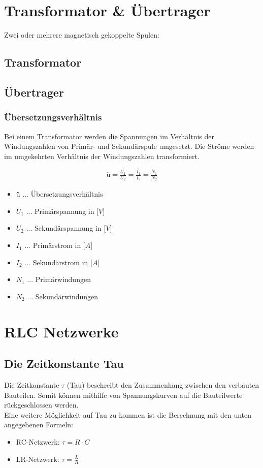 \newpage

\section{Transformator \& Übertrager}
Zwei oder mehrere magnetisch gekoppelte Spulen:

\subsection{Transformator}

\subsection{Übertrager}

\subsubsection*{Übersetzungsverhältnis}

Bei einem Transformator werden die Spannungen im Verhältnis der Windungszahlen von Primär- und Sekundärspule umgesetzt. Die Ströme werden im umgekehrten Verhältnis der Windungszahlen transformiert.

\begin{align}
    \text{ü} = \frac{U_1}{U_2} = \frac{I_1}{I_2} = \frac{N_1}{N_2}
\end{align}
\begin{itemize}
    \item ü ... Übersetzungsverhältnis
    \item $U_1$ ... Primärspannung in [$V$]
    \item $U_2$ ... Sekundärspannung in [$V$]
    \item $I_1$ ... Primärstrom in [$A$]
    \item $I_2$ ... Sekundärstrom in [$A$]
    \item $N_1$ ... Primärwindungen
    \item $N_2$ ... Sekundärwindungen
\end{itemize}

\newpage

\section{RLC Netzwerke}
\subsection{Die Zeitkonstante Tau}
Die Zeitkonstante $\tau$ (Tau) beschreibt den Zusammenhang zwischen den verbauten Bauteilen. Somit können mithilfe von Spannungskurven auf die Bauteilwerte rückgeschlossen werden. \\
Eine weitere Möglichkeit auf Tau zu kommen ist die Berechnung mit den unten angegebenen Formeln:
\begin{itemize}
    \item RC-Netzwerk: {\large $\tau = R\cdot C$}
    \item LR-Netzwerk: {\large $\tau = \frac{L}{R}$}
\end{itemize}
